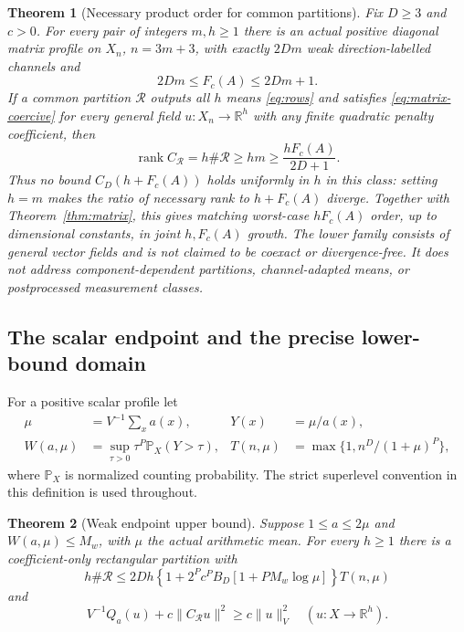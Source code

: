 \documentclass[11pt]{article}
\newtheorem{theorem}{Theorem}[section]
\newcommand{\R}{\mathbb R}
\newcommand{\rank}{\operatorname{rank}}
\newcommand{\normn}[1]{\|#1\|_{V}}
\newcommand{\Prob}{\mathbb P_X}
\begin{document}
\begin{theorem}[Necessary product order for common partitions]\label{thm:common-rank}
Fix $D\ge3$ and $c>0$. For every pair of integers $m,h\ge1$ there is an actual positive
diagonal matrix profile on $X_n$, $n=3m+3$, with exactly $2Dm$ weak
direction-labelled channels and
\[
 2Dm\le F_c(A)\le2Dm+1.
\]
If a common partition $\mathcal R$ outputs all $h$ means
\eqref{eq:rows} and satisfies \eqref{eq:matrix-coercive} for every general
field $u:X_n\to\R^h$ with any finite quadratic penalty coefficient, then
\begin{equation}\label{eq:product-lower}
 \rank C_{\mathcal R}=h\#\mathcal R\ge hm
                  \ge\frac{hF_c(A)}{2D+1}.
\end{equation}
Thus no bound $C_D(h+F_c(A))$ holds uniformly in $h$ in this class:
setting $h=m$ makes the ratio of necessary rank to $h+F_c(A)$ diverge.
Together with Theorem~\ref{thm:matrix}, this gives matching worst-case
$hF_c(A)$ order, up to dimensional constants, in joint $h,F_c(A)$ growth.
The lower family consists of general vector fields and is not claimed to
be coexact or divergence-free. It does not address component-dependent
partitions, channel-adapted means, or postprocessed measurement classes.
\end{theorem}
\subsection{The scalar endpoint and the precise lower-bound domain}
For a positive scalar profile let
\begin{equation}\label{eq:weak-def}
 \begin{aligned}
 \mu&=V^{-1}\sum_xa(x),&Y(x)&=\mu/a(x),\\
 W(a,\mu)&=\sup_{\tau>0}\tau^P\Prob(Y>\tau),&
 T(n,\mu)&=\max\{1,n^D/(1+\mu)^P\},
 \end{aligned}
\end{equation}
where $\Prob$ is normalized counting probability. The strict superlevel
convention in this definition is used throughout.

\begin{theorem}[Weak endpoint upper bound]\label{thm:weakupper}
Suppose $1\le a\le2\mu$ and $W(a,\mu)\le M_w$, with $\mu$ the actual
arithmetic mean. For every $h\ge1$ there is a coefficient-only rectangular
partition with
\begin{equation}\label{eq:weak-upper-count}
 h\#\mathcal R\le
 2Dh\left\{1+2^Pc^PB_D[1+P M_w\log\mu]\right\}T(n,\mu)
\end{equation}
and
\begin{equation}\label{eq:scalar-coercive}
 V^{-1}Q_a(u)+c\|C_{\mathcal R}u\|^2\ge c\normn{u}^2
 \quad(u:X\to\R^h).
\end{equation}
\end{theorem}
\end{document}
